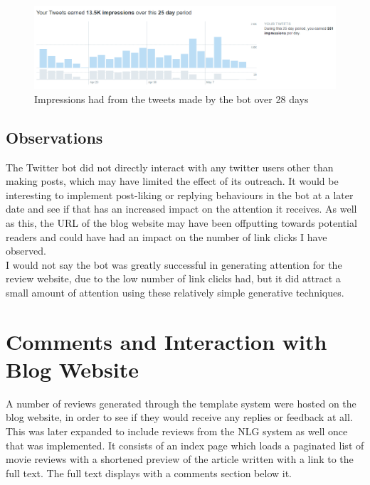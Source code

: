 \begin{figure}
\centering
\includegraphics[width=0.7\linewidth]{figures/twitter_analytics/impressions}
\caption{Impressions had from the tweets made by the bot over 28 days}
\label{fig:impressions}
\end{figure}


\subsection{Observations}
The Twitter bot did not directly interact with any twitter users other than making posts, which may have limited the effect of its outreach. It would be interesting to implement post-liking or replying behaviours in the bot at a later date and see if that has an increased impact on the attention it receives. As well as this, the URL of the blog website may have been offputting towards potential readers and could have had an impact on the number of link clicks I have observed.\\
I would not say the bot was greatly successful in generating attention for the review website, due to the low number of link clicks had, but it did attract a small amount of attention using these relatively simple generative techniques.


\section{Comments and Interaction with Blog Website}
A number of reviews generated through the template system were hosted on the blog website, in order to see if they would receive any replies or feedback at all. This was later expanded to include reviews from the NLG system as well once that was implemented. It consists of an index page which loads a paginated list of movie reviews with a shortened preview of the article written with a link to the full text. The full text displays with a comments section below it.

